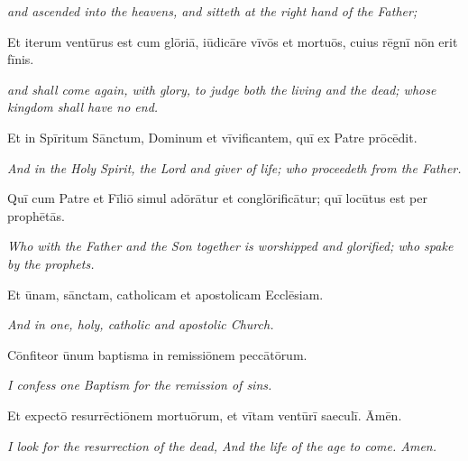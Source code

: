 \documentclass{article}
\begin{document}
\emph{\scriptsize and ascended into the heavens, and sitteth at the right hand of the Father;}

Et iterum ventūrus est cum glōriā, iūdicāre vīvōs et mortuōs, cuius rēgnī nōn erit fīnis.

\emph{\scriptsize and shall come again, with glory, to judge both the living and the dead; whose kingdom shall have no end. }

Et in Spīritum Sānctum, Dominum et vīvificantem, quī ex Patre prōcēdit.

\emph{\scriptsize And in the Holy Spirit, the Lord and giver of life; who proceedeth from the Father.}

Quī cum Patre et Fīliō simul adōrātur et conglōrificātur; quī locūtus est per prophētās.

\emph{\scriptsize Who with the Father and the Son together is worshipped and glorified; who spake by the prophets.}

Et ūnam, sānctam, catholicam et apostolicam Ecclēsiam.

\emph{\scriptsize And in one, holy, catholic and apostolic Church.}

Cōnfiteor ūnum baptisma in remissiōnem peccātōrum.

\emph{\scriptsize I confess one Baptism for the remission of sins.}

Et expectō resurrēctiōnem mortuōrum, et vītam ventūrī saeculī. Āmēn.

\emph{\scriptsize I look for the resurrection of the dead, And the life of the age to come. Amen.}
\end{document}
